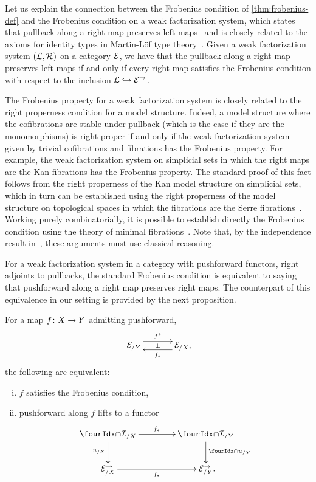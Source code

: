 \documentclass[reqno,10pt,a4paper,oneside,draft]{amsart}
\begin{document}
Let us explain the connection between the Frobenius condition of \cref{thm:frobenius-def} and the Frobenius condition on a weak factorization system, which states that pullback along a right map preserves left maps~\cite{garner:types-omega-groupoids,garner:topological-simplicial} and is closely related to the axioms for identity types in Martin-L\"of type theory~\cite{gambino-garner:idtypewfs}.
Given a weak factorization system $(\cal{L}, \cal{R})$ on a category $\catE$, we have that the pullback along a right map preserves left maps if and only if every right map satisfies the Frobenius condition with respect to the inclusion $\cal{L} \hookrightarrow \catE^\to$.

\begin{remark}
The Frobenius property for a weak factorization system is closely related to the right properness condition for a model structure.
Indeed, a model structure where the cofibrations are stable under pullback (which is the case if they are the monomorphisms) is right proper if and only if the weak factorization system given by trivial cofibrations and fibrations has the Frobenius property.
For example, the weak factorization system on simplicial sets in which the right maps are the Kan fibrations has the Frobenius property.
The standard proof of this fact follows from the right properness of the Kan model structure on simplicial sets, which in turn can be established using the right properness of the model structure on topological spaces in which the fibrations are the Serre fibrations~\cite[Theorem~13.1.13]{hirschhorn-model-localizations}.
Working purely combinatorially, it is possible to establish directly the Frobenius condition using the theory of minimal fibrations~\cite[Theorem~1.7.1]{joyal-tierney-notes}.
Note that, by the independence result in~\cite{coquand-non-constructivity-kan}, these arguments must use classical reasoning.
\end{remark}

For a weak factorization system in a category with pushforward functors, \ie right adjoints to pullbacks, the standard Frobenius condition is equivalent to saying that pushforward along a right map preserves right maps.
The counterpart of this equivalence in our setting is provided by the next proposition.

\begin{proposition} \label{lift-dependent-product}
For a map $f \co X \to Y$ admitting pushforward,
\[
\xymatrix@C+1em{
  \catE_{/Y}
  \ar@<5pt>[r]^{f^*}
  \ar@{}[r]|{\bot}
&
  \catE_{/X}
  \ar@<5pt>[l]^{f_*}
\rlap{,}}
\]
the following are equivalent:
\begin{enumerate}[(i)]
\item $f$ satisfies the Frobenius condition,
\item pushforward along $f$ lifts to a functor
\[
\xymatrix@C=1.5cm{
  {\liftr{\cal{I}}}_{/X}
  \ar[r]^{f_*}
  \ar[d]_{u_{/X}}
&
  {\liftr{\cal{I}}}_{/Y}
  \ar[d]^{{\liftr{u}}_{/Y}}
\\
  \catE_{/X}^\to
  \ar[r]_{f_*}
&
  \catE_{/Y}^\to
\rlap{.}}
\]

\end{enumerate}
\end{proposition}
\end{document}
